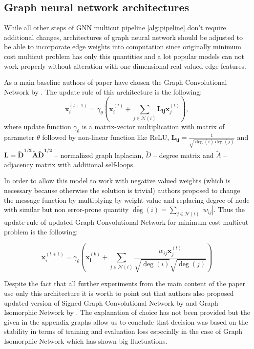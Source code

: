 \documentclass[10pt, twocolumn, a4paper]{article}
\theoremstyle{definition}
\begin{document}
\subsection{Graph neural network architectures}
While all other steps of GNN multicut pipeline \ref{alg:pipeline} don't require
additional changes, architectures of graph neural network should be adjusted to be able to incorporate
edge weights into computation since originally minimum cost multicut problem has only this quantities and
a lot popular models can not work properly without alteration with one dimensional real-valued edge features.

As a main baseline authors of paper have chosen the Graph Convolutional Network by \citet{kipf2016semi}.
The update rule of this architecture is the following:
\[
    \mathbf{x}_i^{(t+1)} = \gamma_{\theta} \left( \mathbf{x}_i^{(t)} +
    \sum\limits_{j \in \mathcal{N}(i)} \mathbf{L_{ij}} \mathbf{x}_j^{(t)} \right),
\]
where update function $\gamma_{\theta}$ is a matrix-vector multiplication with matrix of parameter $\theta$ followed by
non-linear function like ReLU, $\mathbf{L_{ij}} = \frac{1}{\sqrt{\deg(i) \deg(j)}}$ and
$\mathbf{L} = \mathbf{\tilde{D}^{1/2} \tilde{A} \tilde{D}^{1/2}}$ -- normalized graph laplacian, $\tilde{D}$ --
degree matrix and $\tilde{A}$ -- adjacency matrix with additional self-loops.

In order to allow this model to work with negative valued weights (which is necessary because otherwise
the solution is trivial) authors proposed to change the message function by multiplying by weight value and
replacing degree of node with similar but non error-prone quantity
$\overline{\deg}(i) = \sum\limits_{j \in \mathcal{N}(i)} |w_{ij}|$. Thus the update rule of updated
Graph Convolutional Network for minimum cost multicut problem is the following:

\[
    \mathbf{x}_i^{(t+1)} = \gamma_{\theta} \left(
    \mathbf{x^{(t)}_i} +
    \sum_{j \in \mathcal{N}(i)}
    \frac{w_{ij} \mathbf{x}_j^{(t)}}
    {\sqrt{\overline{\deg}(i)} \sqrt{\overline{\deg}(j)}}
    \right)
\]

Despite the fact that all further experiments from the main content of the paper use only this architecture
it is worth to point out that authors also proposed updated version of Signed
Graph Convolutional Network by \citet{derr2018signed} and Graph Isomorphic Network by \citet{xu2018powerful}.
The explanation of choice has not been provided but the given in the appendix graphs allow us to conclude
that decision was based on the stability in terms of training and evaluation loss especially in the case
of Graph Isomorphic Network which has shown big fluctuations.
\end{document}
